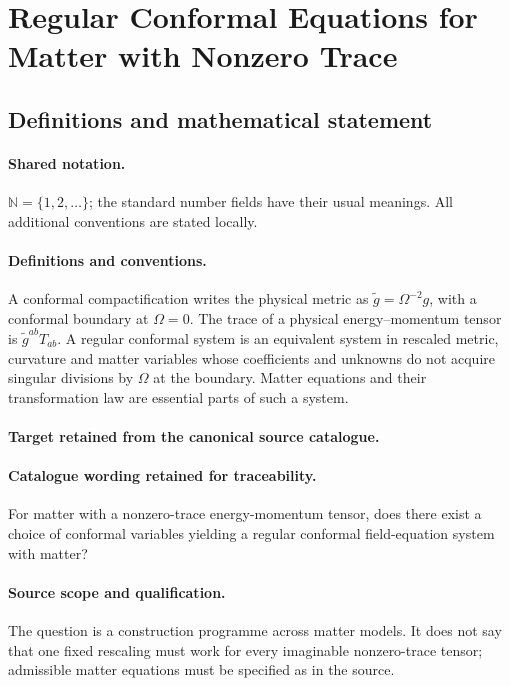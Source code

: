 \documentclass[11pt]{article}
\begin{document}
\section{Regular Conformal Equations for Matter with Nonzero Trace}\label{statement}

\subsection{Definitions and mathematical statement}

\paragraph{Shared notation.}$\mathbb N=\{1,2,\ldots\}$; the standard number fields have their usual meanings. All additional conventions are stated locally.


\paragraph{Definitions and conventions.}
A conformal compactification writes the physical metric as $\widetilde g=\Omega^{-2}g$, with a conformal boundary at $\Omega=0$. The trace of a physical energy--momentum tensor is $\widetilde g^{ab}T_{ab}$. A regular conformal system is an equivalent system in rescaled metric, curvature and matter variables whose coefficients and unknowns do not acquire singular divisions by $\Omega$ at the boundary. Matter equations and their transformation law are essential parts of such a system.

\paragraph{Target retained from the canonical source catalogue.}
\paragraph{Catalogue wording retained for traceability.}
For matter with a nonzero-trace energy-momentum tensor, does there exist a choice of conformal variables yielding a regular conformal field-equation system with matter?

\paragraph{Source scope and qualification.}
The question is a construction programme across matter models. It does not say that one fixed rescaling must work for every imaginable nonzero-trace tensor; admissible matter equations must be specified as in the source.
\end{document}
